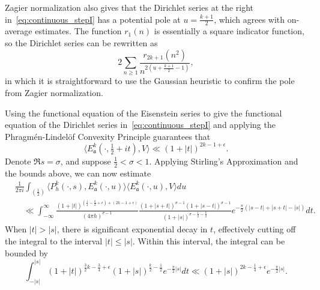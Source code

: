 \begin{remark}
  Zagier normalization also gives that the Dirichlet series at the right
  in~\eqref{eq:continuous_stepI} has a potential pole at $u = \frac{k+1}{2}$, which agrees
  with on-average estimates.
  The function $r_1(n)$ is essentially a square indicator function, so the Dirichlet
  series can be rewritten as
  \begin{equation}
    2\sum_{n \geq 1} \frac{r_{2k+1}(n^2)}{n^{2(u + \frac{k+1}{2} - 1)}},
  \end{equation}
  in which it is straightforward to use the Gaussian heuristic to confirm the pole from
  Zagier normalization.
\end{remark}


Using the functional equation of the Eisenstein series to give the functional equation of
the Dirichlet series in~\eqref{eq:continuous_stepI} and applying the Phragm\'en-Lindel\"of
Convexity Principle guarantees that
\begin{equation}
  \langle E_\mathfrak{a}^k(\cdot, \tfrac{1}{2} + it), V \rangle \ll (1 + \lvert t
  \rvert)^{2k - 1 + \epsilon}.
\end{equation}
Denote $\Re s = \sigma$, and suppose $\tfrac{1}{2} < \sigma < 1$.
Applying Stirling's Approximation and the bounds above, we can now estimate
\begin{align}
  &\frac{1}{2\pi i} \int_{(\frac{1}{2})} \langle P_h^k(\cdot, s),
E^k_{\mathfrak{a}}(\cdot, u) \rangle \langle E^k_{\mathfrak{a}}(\cdot, u), V \rangle du \\
  &\quad \ll \int_{-\infty}^\infty
  \frac{(1 + \lvert t \rvert)^{(\frac{1}{4} - \frac{k}{2} + \epsilon) + (2k - 1 +
  \epsilon)}}{(4\pi h)^{\sigma - 1}}
  \frac{(1 + \lvert s + t \rvert)^{\sigma - 1} (1 + \lvert s - t \rvert)^{\sigma - 1}}{(1
  + \lvert s \rvert)^{\sigma - \frac{1}{2} - \frac{k}{2}}}
  e^{-\frac{\pi}{2}(\lvert s - t \rvert + \lvert s + t \rvert - \lvert s \rvert)}dt.
\end{align}
When $\lvert t \rvert > \lvert s \rvert$, there is significant exponential decay in $t$,
effectively cutting off the integral to the interval $\lvert t \rvert \leq \lvert s
\rvert$.
Within this interval, the integral can be bounded by
\begin{equation}
  \int_{-\lvert s \rvert}^{\lvert s \rvert} (1 + \lvert t \rvert)^{\frac{3}{2}k -
  \frac{3}{4} + \epsilon} (1 + \lvert s \rvert)^{\frac{k}{2} - \frac{1}{2}}
  e^{-\frac{\pi}{2}\lvert s \rvert} dt \ll (1 + \lvert s \rvert)^{2k - \frac{1}{4} +
  \epsilon} e^{-\frac{\pi}{2}\lvert s \rvert}.
\end{equation}


